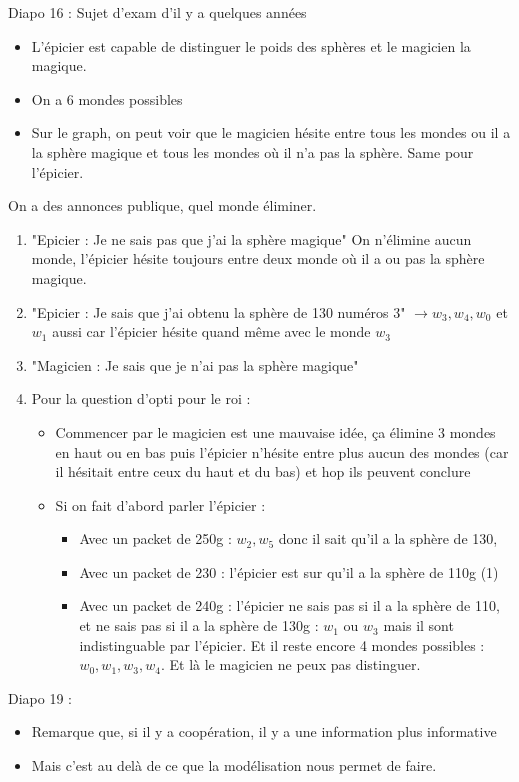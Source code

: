 \documentclass{article}
\theoremstyle{plain}%
\theoremstyle{definition}
\theoremstyle{remark}
\begin{document}
Diapo 16 : Sujet d'exam d'il y a quelques années
\begin{itemize}
    \item L'épicier est capable de distinguer le poids des sphères et le magicien la magique.
    \item On a 6 mondes possibles
    \item Sur le graph, on peut voir que le magicien hésite entre tous les mondes ou il a la sphère magique et tous les mondes où il n'a pas la sphère. Same pour l'épicier.
\end{itemize}
On a des annonces publique, quel monde éliminer.
\begin{enumerate}
    \item "Epicier : Je ne sais pas que j'ai la sphère magique" On n'élimine aucun monde, l'épicier hésite toujours entre deux monde où il a ou pas la sphère magique.
    \item "Epicier : Je sais que j'ai obtenu la sphère de 130 numéros 3" $\rightarrow w_3, w_4, w_0$ et $ w_1 $ aussi car l'épicier hésite quand même avec le monde $ w_3 $ 
    \item "Magicien : Je sais que je n'ai pas la sphère magique" 
    \item Pour la question d'opti pour le roi : \begin{itemize}
        \item Commencer par le magicien est une mauvaise idée, ça élimine 3 mondes en haut ou en bas puis l'épicier n'hésite entre plus aucun des mondes (car il hésitait entre ceux du haut et du bas) et hop ils peuvent conclure
        \item Si on fait d'abord parler l'épicier : \begin{itemize}
            \item Avec un packet de 250g : $ w_2, w_5 $ donc il sait qu'il a la sphère de 130, 
            \item Avec un packet de 230 : l'épicier est sur qu'il a la sphère de 110g (1)
            \item Avec un packet de 240g : l'épicier ne sais pas si il a la sphère de 110, et ne sais pas si il a la sphère de 130g : $ w_1 $ ou $ w_3 $ mais il sont indistinguable par l'épicier. Et il reste encore 4 mondes possibles : $ w_0, w_1, w_3, w_4 $. Et là le magicien ne peux pas distinguer. 
        \end{itemize}
    \end{itemize}
\end{enumerate}
Diapo 19 : 
\begin{itemize}
    \item Remarque que, si il y a coopération, il y a une information plus informative
    \item Mais c'est au delà de ce que la modélisation nous permet de faire.
\end{itemize}
\end{document}
